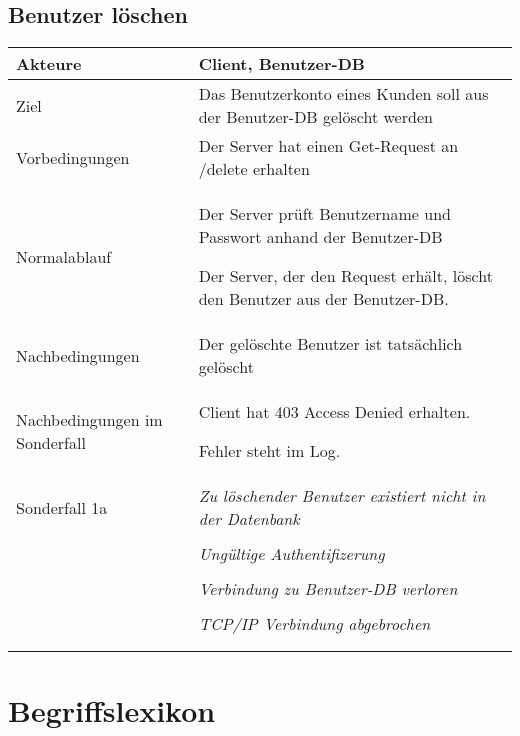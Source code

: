 \documentclass[a4paper,10pt,titlepage,parskip=true]{article}
\makeatletter
\newcommand\novspace{\@minipagetrue}
\newenvironment{owncompactitem}{%
\compactitem
}{%
\@finalstrut\@arstrutbox
\@nameuse{endcompactitem}%
\aftergroup\let\aftergroup\@finalstrut\aftergroup\@gobble
}
\newenvironment{owncompactenum}{%
\compactenum
}{%
\@finalstrut\@arstrutbox
\@nameuse{endcompactenum}%
\aftergroup\let\aftergroup\@finalstrut\aftergroup\@gobble
}
\newcommand{\usecase}[7]
{\subsection{#1}
\setlength{\extrarowheight}{2pt}
\begin{tabular}{|p{0.2\textwidth}|p{0.9\textwidth}|}
\hline
  Akteure & #2\\\hline
  Ziel & #3\\\hline
  Vorbedingungen & \novspace
  	\begin{owncompactitem}[-] #4 \end{owncompactitem} \\\hline
  Normalablauf & \vspace{-7pt}
  	\begin{owncompactenum}[1.] #6 \end{owncompactenum} \\\hline
  Nachbedingungen & \novspace
  	\begin{owncompactitem}[-] #5 \end{owncompactitem} \\\hline
  #7
\end{tabular}
}
\newcommand{\sonderfall}[4][\empty]
{
Sonderfall #2 & \vspace{-10pt}
	\textit{#3}
	\begin{owncompactenum}[{#2}.1] {#4} \end{owncompactenum}
  	\ifthenelse{\equal{#1}{\empty}}
    	{\\\hline} %
    	{\ensuremath{\rightarrow} #1 \\ [+1pt] \hline} %

}
\newcommand{\sondernachbedingung}[1]
{
Nachbedingungen im Sonderfall& \novspace
	\begin{owncompactitem}[-]
		#1
	\end{owncompactitem} \\\hline
}
\makeatother
\begin{document}
\usecase{Benutzer löschen}{Client, Benutzer-DB}%
{Das Benutzerkonto eines Kunden soll aus der Benutzer-DB gelöscht werden}%
{%
  \item Der Server hat einen Get-Request an /delete erhalten
}
{%
  \item Der gelöschte Benutzer ist tatsächlich gelöscht
}
{%
  \item Der Server prüft Benutzername und Passwort anhand der Benutzer-DB
  \item Der Server, der den Request erhält, löscht den Benutzer aus der Benutzer-DB.
}
{%
  \sondernachbedingung{
	\item Client hat 403 Access Denied erhalten.
	\item Fehler steht im Log.
	}
  \sonderfall[Weiter mit normalem Betrieb]{1a}%
	  {Zu löschender Benutzer existiert nicht in der Datenbank}%
	  {
	  \item Der Server schickt eine entsprechende Fehlermeldung an den Client, der die Lösch-Anfrage verursacht hat
	  }
	  		\sonderfall[Weiter mit normalem Betrieb]{1a}
    {Ungültige Authentifizerung}
    {
    \item Fehler wird ins Log geschrieben
  	\item Der Client erhält eine entsprechende Fehlermeldung mit HTTP-Status 403 Access Denied
    }
	\sonderfall[Kritischer Fehler, Server ist beendet]{*}%
	{Verbindung zu Benutzer-DB verloren}%
  	{
	\item Der Fehler wird ins Log geschrieben (als schwerwiegender Fehler)
	\item Der Client erhält eine entsprechende Fehlermeldung
	\item Der Server wird beendet
  	}

\sonderfall[Weiter mit normalem Betrieb]{**}%
	{TCP/IP Verbindung abgebrochen}%
	{
	\item Fehlermeldung wird ins Log geschrieben
	}
}
\clearpage
\appendix
\section{Begriffslexikon}
\end{document}
